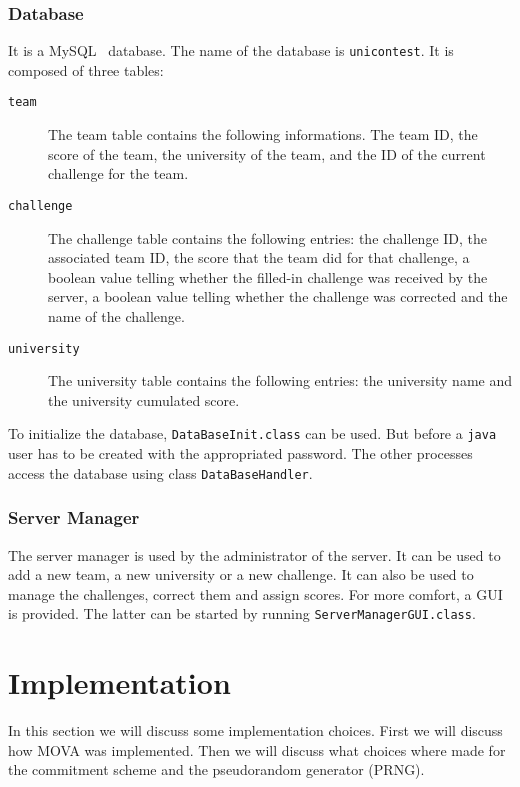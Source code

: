     \subsubsection{Database}
    It is a MySQL~\cite{cite:sql} database. The name of the database is \texttt{unicontest}. It is composed of three tables:
    \begin{description}
        \item[\texttt{team}] The team table contains the following informations. 
            The team ID, the score of the team, the university of the team,  and the ID of the current challenge for the team.
        \item[\texttt{challenge}] The challenge table contains the following entries: 
            the challenge ID, the associated team ID, the score that the team did for that challenge, a boolean value telling
            whether the filled-in challenge was received by the server, a boolean value telling whether the challenge was corrected and the name of the challenge.
        \item[\texttt{university}] The university table contains the following entries: the university name and the university cumulated score.
    \end{description}
    To initialize the database, \texttt{DataBaseInit.class} can be used. But before a \texttt{java} user has to be created with the appropriated password.
    The other processes access the database using class \texttt{DataBaseHandler}.
    
    \subsubsection{Server Manager}
    The server manager is used by the administrator of the server. It can be used to add a new team, a new university or a new challenge. It can also be used to manage the challenges,
    correct them and assign scores. For more comfort, a GUI is provided. The latter can be started by running \texttt{ServerManagerGUI.class}.
    
    \section{Implementation} 
    \label{sec:implementation}
    In this section we will discuss some implementation choices. First we will discuss how MOVA was implemented. Then we will
    discuss what choices where made for the commitment scheme and the pseudorandom generator (PRNG).

